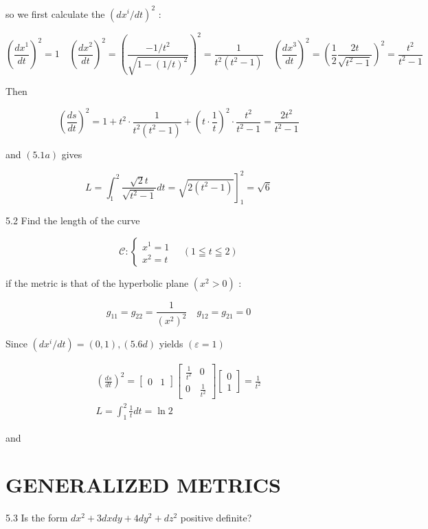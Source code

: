 \documentclass[10pt]{article}
\begin{document}
so we first calculate the $\left(d x^{i} / d t\right)^{2}$ :

$$
\left(\frac{d x^{1}}{d t}\right)^{2}=1 \quad\left(\frac{d x^{2}}{d t}\right)^{2}=\left(\frac{-1 / t^{2}}{\sqrt{1-(1 / t)^{2}}}\right)^{2}=\frac{1}{t^{2}\left(t^{2}-1\right)} \quad\left(\frac{d x^{3}}{d t}\right)^{2}=\left(\frac{1}{2} \frac{2 t}{\sqrt{t^{2}-1}}\right)^{2}=\frac{t^{2}}{t^{2}-1}
$$

Then

$$
\left(\frac{d s}{d t}\right)^{2}=1+t^{2} \cdot \frac{1}{t^{2}\left(t^{2}-1\right)}+\left(t \cdot \frac{1}{t}\right)^{2} \cdot \frac{t^{2}}{t^{2}-1}=\frac{2 t^{2}}{t^{2}-1}
$$

and $(5.1 a)$ gives

$$
\left.L=\int_{1}^{2} \frac{\sqrt{2} t}{\sqrt{t^{2}-1}} d t=\sqrt{2\left(t^{2}-1\right)}\right]_{1}^{2}=\sqrt{6}
$$

5.2 Find the length of the curve

$$
\mathscr{C}:\left\{\begin{array}{l}
x^{1}=1 \\
x^{2}=t
\end{array} \quad(1 \leqq t \leqq 2)\right.
$$

if the metric is that of the hyperbolic plane $\left(x^{2}>0\right)$ :

$$
g_{11}=g_{22}=\frac{1}{\left(x^{2}\right)^{2}} \quad g_{12}=g_{21}=0
$$

Since $\left(d x^{i} / d t\right)=(0,1),(5.6 d)$ yields $(\varepsilon=1)$

$$
\begin{gathered}
\left(\frac{d s}{d t}\right)^{2}=\left[\begin{array}{ll}
0 & 1
\end{array}\right]\left[\begin{array}{cc}
\frac{1}{t^{2}} & 0 \\
0 & \frac{1}{t^{2}}
\end{array}\right]\left[\begin{array}{c}
0 \\
1
\end{array}\right]=\frac{1}{t^{2}} \\
L=\int_{1}^{2} \frac{1}{t} d t=\ln 2
\end{gathered}
$$

and

\section*{GENERALIZED METRICS}
5.3 Is the form $d x^{2}+3 d x d y+4 d y^{2}+d z^{2}$ positive definite?
\end{document}
